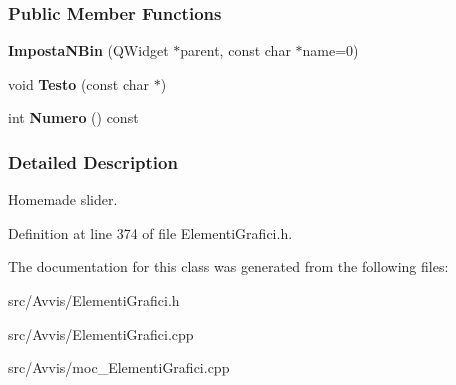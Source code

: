\subsubsection*{Public Member Functions}
\begin{DoxyCompactItemize}
\item 
{\bfseries Imposta\+N\+Bin} (Q\+Widget $\ast$parent, const char $\ast$name=0)\hypertarget{classImpostaNBin_a6b13f1131d1a02b8848404b52193f680}{}\label{classImpostaNBin_a6b13f1131d1a02b8848404b52193f680}

\item 
void {\bfseries Testo} (const char $\ast$)\hypertarget{classImpostaNBin_ad131323a76ebb0197218c09233f7359a}{}\label{classImpostaNBin_ad131323a76ebb0197218c09233f7359a}

\item 
int {\bfseries Numero} () const \hypertarget{classImpostaNBin_ae1a67f98002156c9ae9130e248472cec}{}\label{classImpostaNBin_ae1a67f98002156c9ae9130e248472cec}

\end{DoxyCompactItemize}


\subsubsection{Detailed Description}
Homemade slider. 

Definition at line 374 of file Elementi\+Grafici.\+h.



The documentation for this class was generated from the following files\+:\begin{DoxyCompactItemize}
\item 
src/\+Avvis/Elementi\+Grafici.\+h\item 
src/\+Avvis/Elementi\+Grafici.\+cpp\item 
src/\+Avvis/moc\+\_\+\+Elementi\+Grafici.\+cpp\end{DoxyCompactItemize}
